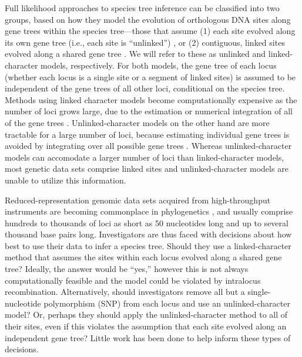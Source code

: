 Full likelihood approaches to species 
tree inference can be
classified into two groups, based on how they model the 
evolution of orthologous DNA sites along gene trees within the species 
tree---those that assume (1) each site evolved along its own gene tree 
(i.e., each site is ``unlinked'') 
\citep{bryantInferringSpeciesTrees2012, maioPoMoAlleleFrequencyBased2015}, 
or (2) contiguous, linked sites evolved along a shared gene tree 
\citep{liuSpeciesTreesGene2007, Heled2010, ogilvieStarBEAST2BringsFaster2017, 
yangBPPProgramSpecies2015}. We will refer to these as unlinked and 
linked-character models, respectively. For both models, the gene tree of each 
locus (whether each locus is a single site or a segment of linked sites) 
is assumed to be independent of the gene 
trees of all other loci, conditional on the species tree.
Methods using linked character models become computationally expensive as the
number of loci grows large, due to the estimation or numerical integration of
all of the gene trees \citep{bryantInferringSpeciesTrees2012}.
Unlinked-character models on the other 
hand are more tractable for a large number of loci, because  estimating 
individual gene trees is avoided by integrating over all possible gene trees 
\citep{bryantInferringSpeciesTrees2012}.
Whereas unlinked-character models can accomodate a larger number of loci than
linked-character models, most genetic data sets comprise linked sites and
unlinked-character models are unable to utilize this information.

Reduced-representation genomic data sets acquired from high-throughput
instruments are becoming commonplace in phylogenetics \citep{Leache2017}, and
usually comprise hundreds to thousands of loci as short as 50 nucleotides long
and up to several thousand base pairs long.
Investigators are thus faced with decisions about how best to 
use their data to infer a species tree.
Should they use a linked-character method that assumes the sites within each
locus evolved along a shared gene tree?
Ideally, the answer would be ``yes,'' however this is not always
computationally feasible and the model could be violated by intralocus
recombination.
Alternatively, should investigators remove all but a single-nucleotide
polymorphism (SNP) from each locus and use an unlinked-character model?
Or, perhaps they should apply the unlinked-character method to all of their
sites, even if this violates the assumption that each site evolved along an
independent gene tree?
Little work has been done to help inform these types of decisions. 


